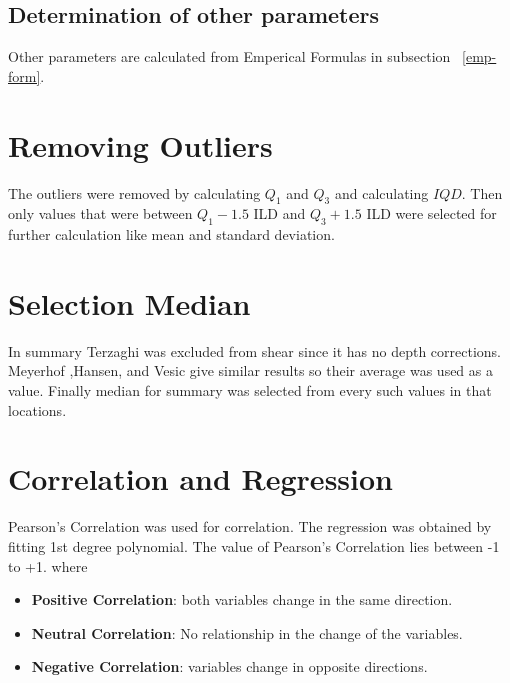 \subsection{Determination of other parameters}
Other parameters are calculated from Emperical Formulas in subsection ~\ref{emp-form}.

\section{Removing Outliers}
The outliers were removed by calculating $Q_1$ and $Q_3$ and calculating $IQD$. Then only values that were between $Q_1 - 1.5$ ILD and $Q_3 + 1.5$ ILD were selected for further calculation like mean and standard deviation.

\section{Selection Median}
In summary Terzaghi was excluded from shear since it has no depth corrections. Meyerhof ,Hansen, and Vesic give similar results so their average was used as a value. Finally median for summary was selected from every such values in that locations.

\section{Correlation and Regression}
Pearson’s Correlation was used for correlation. The regression was obtained by fitting 1st degree polynomial. The value of Pearson’s Correlation lies between -1 to +1. where
\begin{itemize}
\item \textbf{Positive Correlation}: both variables change in the same direction.
\item \textbf{Neutral Correlation}: No relationship in the change of the variables.
\item \textbf{Negative Correlation}: variables change in opposite directions.
\end{itemize}